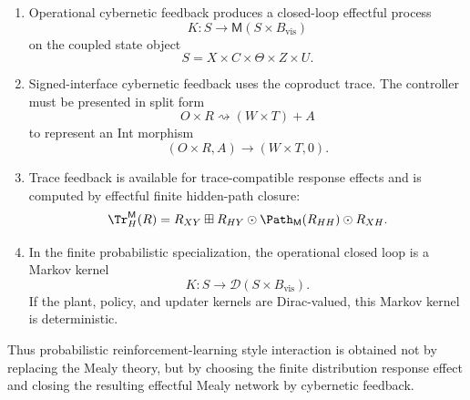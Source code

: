 \begin{enumerate}
\item Operational cybernetic feedback produces a closed-loop effectful process
\[
K:S\to\mathsf M(S\times B_{\mathrm{vis}})
\]
on the coupled state object
\[
S=X\times C\times\Theta\times Z\times U.
\]

\item Signed-interface cybernetic feedback uses the coproduct trace.  The controller must be
presented in split form
\[
O\times R\rightsquigarrow (W\times T)+A
\]
to represent an Int morphism
\[
(O\times R,A)\to(W\times T,0).
\]

\item Trace feedback is available for trace-compatible response effects and is computed by
effectful finite hidden-path closure:
\[
\Tr^{\mathsf M}_H(R)
=
R_{XY}
\boxplus
R_{HY}\odot
\Path_{\mathsf M}(R_{HH})
\odot
R_{XH}.
\]

\item In the finite probabilistic specialization, the operational closed loop is a Markov kernel
\[
K:S\to\mathcal D(S\times B_{\mathrm{vis}}).
\]
If the plant, policy, and updater kernels are Dirac-valued, this Markov kernel is deterministic.
\end{enumerate}

Thus probabilistic reinforcement-learning style interaction is obtained not by replacing the Mealy
theory, but by choosing the finite distribution response effect and closing the resulting effectful
Mealy network by cybernetic feedback.